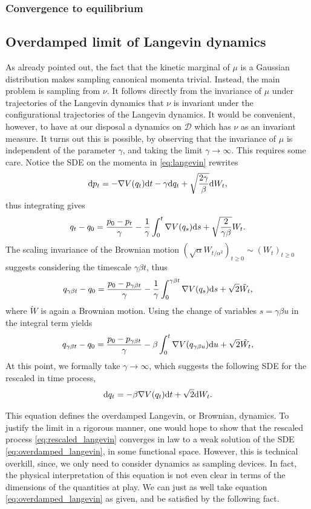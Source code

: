     \subsubsection{Convergence to equilibrium}

\subsection{Overdamped limit of Langevin dynamics}
    As already pointed out, the fact that the kinetic marginal of $\mu$ is a Gaussian distribution makes sampling canonical momenta trivial. 
    Instead, the main problem is sampling from $\nu$. It follows directly from the invariance of $\mu$ under trajectories of the Langevin dynamics that $\nu$ is invariant under the configurational trajectories of the Langevin dynamics.
    It would be convenient, however, to have at our disposal a dynamics on $\mathcal D$ which has $\nu$ as an invariant measure.
    It turns out this is possible, by observing that the invariance of $\mu$ is independent of the parameter $\gamma$, and taking the limit $\gamma\to\infty$. This requires some care.
    Notice the SDE on the momenta in \eqref{eq:langevin} rewrites 
    \[\mathrm{d} p_t=-\nabla V(q_t)\mathrm{d} t-\gamma \mathrm{d} q_t+\sqrt{\frac{2\gamma}\beta}\mathrm{d} W_t,\]
    thus integrating gives
    \[q_t-q_0=\frac{p_0-p_t}\gamma -\frac{1}\gamma\int_0^t\nabla V(q_s)\mathrm{d} s +\sqrt{\frac{2}{\gamma\beta}}W_t.\]
    The scaling invariance of the Brownian motion $(\sqrt{\alpha}W_{t/\alpha^2})_{t\geq 0}\sim (W_t)_{t\geq 0}$ suggests considering the timescale $\gamma\beta t$, thus
    \[q_{\gamma\beta t}-q_0=\frac{p_0-p_{\gamma\beta t}}\gamma-\frac1{\gamma}\int_0^{\gamma\beta t}\nabla V(q_s)\mathrm{d} s +\sqrt{2}\tilde{W_t},\]
    where $\tilde W$ is again a Brownian motion. Using the change of variables $s=\gamma \beta u$ in the integral term yields
    \begin{equation}\label{eq:rescaled_langevin}q_{\gamma\beta t}-q_0=\frac{p_0-p_{\gamma\beta t}}\gamma-\beta\int_0^{t}\nabla V(q_{\gamma\beta u})\mathrm{d} u +\sqrt{2}\tilde{W_t},\end{equation}
    At this point, we formally take $\gamma\to\infty$, which suggests the following SDE for the rescaled in time process,
    \begin{equation}
        \label{eq:overdamped_langevin}
        \mathrm{d} q_t=-\beta \nabla V(q_t)\mathrm{d} t+\sqrt{2}\mathrm{d} W_t.
    \end{equation}
    
    This equation defines the overdamped Langevin, or Brownian, dynamics.
    To justify the limit in a rigorous manner, one would hope to show that the rescaled process \eqref{eq:rescaled_langevin} converges in law to a weak solution of the SDE \eqref{eq:overdamped_langevin}, in some functional space.
    However, this is technical overkill, since, we only need to consider dynamics as sampling devices. In fact, the physical interpretation of this equation is not even clear in terms of the dimensions of the quantities at play.
    We can just as well take equation \eqref{eq:overdamped_langevin} as given, and be satisfied by the following fact.

